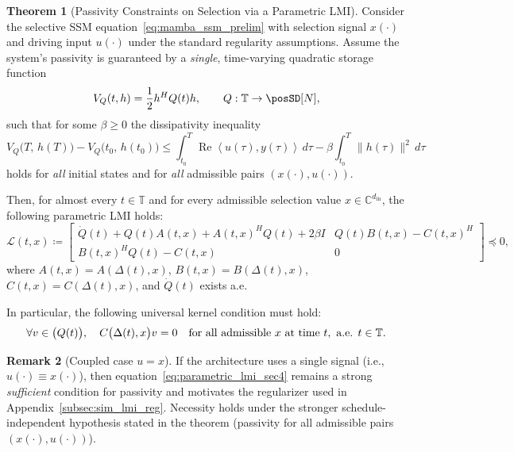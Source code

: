 \documentclass[10pt]{article} %
\def\eqref#1{equation~\ref{#1}}
\newcommand{\timeInt}{\mathbb T}                        %
\newcommand{\ip}[2]{\left\langle #1, #2 \right\rangle} %
\DeclareMathOperator{\realPart}{Re}                     %
\let\ker\relax\DeclareMathOperator{\ker}{Ker}           %
\theoremstyle{definition}
\newtheorem{theorem}{Theorem}[section]
\newtheorem{remark}[theorem]{Remark}
\begin{document}
\begin{theorem}[Passivity Constraints on Selection via a Parametric LMI]
\label{thm:gating_kernel_constraints_sec4}
Consider the selective SSM \eqref{eq:mamba_ssm_prelim} with selection signal $x(\cdot)$ and driving input $u(\cdot)$ under the standard regularity assumptions. Assume the system's passivity is guaranteed by a \emph{single}, time-varying quadratic storage function
\[
V_Q(t,h) = \frac{1}{2} h^H Q(t) h,
\qquad
Q:\timeInt\to \posSD[N],
\]
such that for some $\beta \ge 0$ the dissipativity inequality
\begin{equation} \label{eq:VQ_passivity_selective_repeat_sec4_lmi}
V_Q\bigl(T,\,h(T)\bigr) - V_Q\bigl(t_0,\,h(t_0)\bigr)
\le \int_{t_0}^{T} \realPart\ip{u(\tau)}{y(\tau)}\,d\tau
- \beta\int_{t_0}^{T}\!\|h(\tau)\|^2\,d\tau
\end{equation}
holds for \emph{all} initial states and for \emph{all} admissible pairs $(x(\cdot),u(\cdot))$.

Then, for almost every $t \in \timeInt$ and for every admissible selection value $x \in \mathbb{C}^{d_{\mathrm{in}}}$, the following parametric LMI holds:
\begin{equation} \label{eq:parametric_lmi_sec4}
\mathcal{L}(t, x) \coloneqq
\begin{bmatrix}
\dot Q(t) + Q(t) A(t,x) + A(t,x)^H Q(t) + 2\beta I & Q(t) B(t,x) - C(t,x)^H \\
B(t,x)^H Q(t) - C(t,x) & 0
\end{bmatrix} \preceq 0,
\end{equation}
where $A(t,x)=A(\Delta(t),x)$, $B(t,x)=B(\Delta(t),x)$, $C(t,x)=C(\Delta(t),x)$, and $\dot Q(t)$ exists a.e.

In particular, the following universal kernel condition must hold:
\begin{equation} \label{eq:universal_C_kernel_sec4}
\forall v \in \ker\bigl(Q(t)\bigr), \quad
C\bigl(\Delta(t), x\bigr) v = 0
\quad \text{for all admissible } x \text{ at time } t, \text{ a.e. } t \in \timeInt.
\end{equation}
\end{theorem}

\begin{remark}[Coupled case $u=x$]
If the architecture uses a single signal (i.e., $u(\cdot)\equiv x(\cdot)$), then \eqref{eq:parametric_lmi_sec4} remains a strong \emph{sufficient} condition for passivity and motivates the regularizer used in Appendix~\ref{subsec:sim_lmi_reg}. Necessity holds under the stronger schedule-independent hypothesis stated in the theorem (passivity for all admissible pairs $(x(\cdot),u(\cdot))$).
\end{remark}
\end{document}
